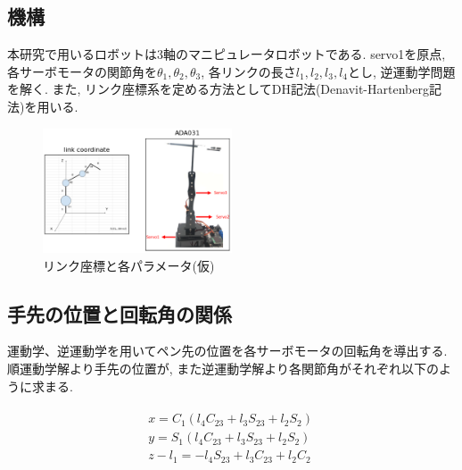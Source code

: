 \documentclass[10pt]{jarticle}
\begin{document}
	\subsection{機構}
	本研究で用いるロボットは3軸のマニピュレータロボットである.
	servo1を原点, 各サーボモータの関節角を$\theta_1, \theta_2, \theta_3$, 各リンクの長さ$l_1, l_2, l_3, l_4$とし, 逆運動学問題を解く.
	また, リンク座標系を定める方法としてDH記法(Denavit-Hartenberg記法)を用いる.

    \begin{center}
        \begin{figure}[h]
            \includegraphics[width=0.5\textwidth]{img/002.png}
            \caption{リンク座標と各パラメータ(仮)}
            \label{manipulator}
        \end{figure}
    \end{center}
    
	\subsection{手先の位置と回転角の関係}
	
	運動学、逆運動学を用いてペン先の位置を各サーボモータの回転角を導出する.
	順運動学解より手先の位置が, また逆運動学解より各関節角がそれぞれ以下のように求まる.
	
	\scriptsize
	\begin{equation}
		\begin{array}{c}
			\begin{split}
				&  x  =  C_1(l_4C_{23}  +  l_3S_{23}  +  l_2S_2)\quad \\
				&  y  =  S_1(l_4C_{23}  +  l_3S_{23}  +  l_2S_2)\quad \\
				&  z  -  l_1  =  -l_4S_{23}  +  l_3C_{23}  +  l_2C_2\quad \\
			\end{split}
		\end{array}
	\end{equation}
\end{document}

